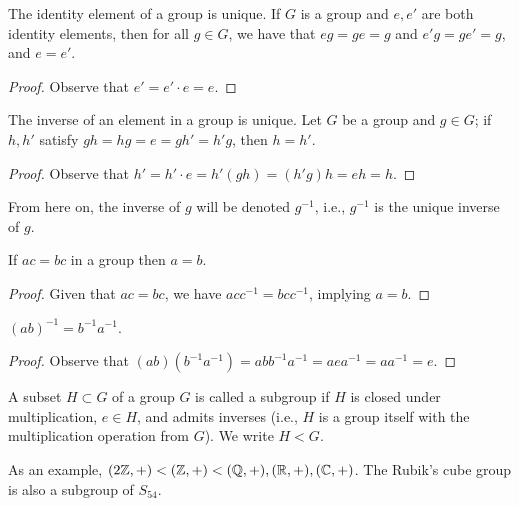 \begin{theorem}
    The identity element of a group is unique. If $G$ is a group and $e, e'$ are both identity elements, then for all $g \in G$, we have that $eg = ge = g$ and $e'g = ge' = g$, and $e = e'$.
\end{theorem}
\begin{proof}
    Observe that $e' = e' \cdot e = e$.
\end{proof}
\begin{theorem}
    The inverse of an element in a group is unique. Let $G$ be a group and $g \in G$; if $h, h'$ satisfy $gh = hg = e = gh' = h'g$, then $h = h'$.
\end{theorem}
\begin{proof}
    Observe that $h' = h' \cdot e = h' (gh) = (h' g) h = eh = h$.
\end{proof}
\noindent From here on, the inverse of $g$ will be denoted $g^{-1}$, i.e., $g^{-1}$ is the unique inverse of $g$.
\begin{theorem}
    If $ac = bc$ in a group then $a = b$.
\end{theorem}
\begin{proof}
    Given that $ac = bc$, we have $ac c^{-1} = bc c^{-1}$, implying $a = b$.
\end{proof}
\begin{theorem}
    $(ab)^{-1} = b^{-1} a^{-1}$.
\end{theorem}
\begin{proof}
    Observe that $(ab) (b^{-1}a^{-1}) = abb^{-1}a^{-1} = aea^{-1} = aa^{-1} = e$.
\end{proof}
\begin{definition}
    A subset $H \subset G$ of a group $G$ is called a subgroup if $H$ is closed under multiplication, $e \in H$, and admits inverses (i.e., $H$ is a group itself with the multiplication operation from $G$). We write $H < G$.
\end{definition}
\noindent As an example, $(2 \mathbb Z, +) < (\mathbb Z, +) < (\mathbb Q, +), (\mathbb R, +), (\mathbb C, +)$. The Rubik's cube group is also a subgroup of $S_{54}$.